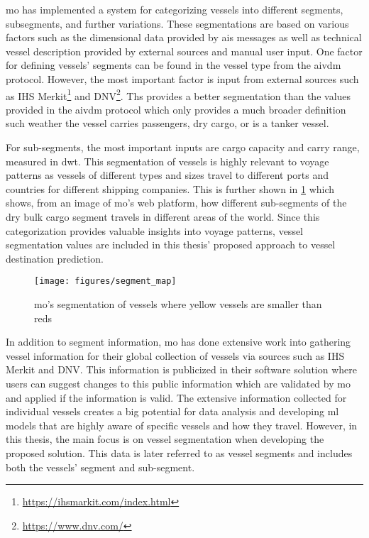 \acrshort{mo} has implemented a system for categorizing vessels into different segments, subsegments, and further variations. These segmentations are based on various factors such as the dimensional data provided by \acrshort{ais} messages as well as technical vessel description provided by external sources and manual user input. One factor for defining vessels' segments can be found in the vessel type from the \gls{aivdm} protocol. However, the most important factor is input from external sources such as IHS Merkit\footnote{\url{https://ihsmarkit.com/index.html}} and DNV\footnote{\url{https://www.dnv.com/}}. Ths provides a better segmentation than the values provided in the \gls{aivdm} protocol which only provides a much broader definition such weather the vessel carries passengers, dry cargo, or is a tanker vessel.

For sub-segments, the most important inputs are cargo capacity and carry range, measured in \acrshort{dwt}. This segmentation of vessels is highly relevant to voyage patterns as vessels of different types and sizes travel to different ports and countries for different shipping companies. This is further shown in \cref{fig:segment_map} which shows, from an image of \acrshort{mo}'s web platform, how different sub-segments of the dry bulk cargo segment travels in different areas of the world. Since this categorization provides valuable insights into voyage patterns, vessel segmentation values are included in this thesis' proposed approach to vessel destination prediction.

\begin{figure}[htbp]
    \centering
    \texttt{[image: figures/segment\_map]}
    \caption{\acrfull{mo}’s segmentation of vessels where yellow vessels are smaller than reds}
    \label{fig:segment_map}
\end{figure}

In addition to segment information, \acrshort{mo} has done extensive work into gathering vessel information for their global collection of vessels via sources such as IHS Merkit and DNV. This information is publicized in their software solution where users can suggest changes to this public information which are validated by \acrshort{mo} and applied if the information is valid. The extensive information collected for individual vessels creates a big potential for data analysis and developing \acrshort{ml} models that are highly aware of specific vessels and how they travel. However, in this thesis, the main focus is on vessel segmentation when developing the proposed solution. This data is later referred to as vessel segments and includes both the vessels' segment and sub-segment.

